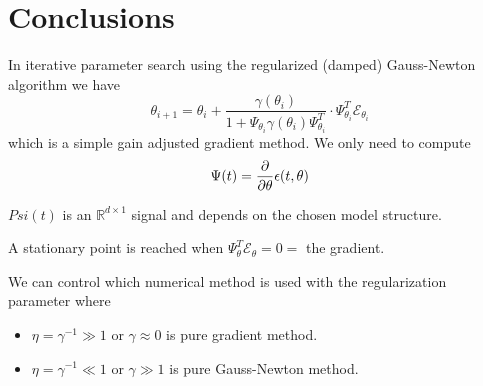 \section{Conclusions}
In iterative parameter search using the regularized (damped) Gauss-Newton algorithm we have
$$\theta_{i+1} = \theta_i + \frac{\gamma(\theta_i)}{1+\Psi_{\theta_i}\gamma(\theta_i)\Psi_{\theta_i}^T}\cdot \Psi_{\theta_i}^T\mathcal{E}_{\theta_i}$$
which is a simple gain adjusted gradient method. We only need to compute
$$\Psi(t) = \frac{\partial}{\partial\theta}\epsilon(t,\theta)$$

$Psi(t)$ is an $\mathbb{R}^{d\times1}$ signal and depends on the chosen model structure.

A stationary point is reached when $\Psi_\theta^T\mathcal{E}_\theta=0=$ the gradient.

We can control which numerical method is used with the regularization parameter where
\begin{itemize}
\item $\eta = \gamma^{-1} \gg 1$ or $\gamma\approx0$ is pure gradient method.
\item $\eta = \gamma^{-1} \ll 1$ or $\gamma\gg1$ is pure Gauss-Newton method.
\end{itemize}
